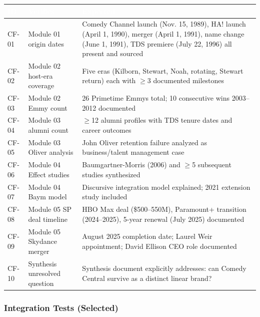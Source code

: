 \documentclass[11pt,letterpaper]{article}
\newcommand{\tableheader}[1]{\textbf{\sffamily\textcolor{white}{#1}}}
\begin{document}
\begin{center}
\begin{tabularx}{\textwidth}{C{1.5cm}L{5cm}X}
\toprule
{}
\tableheader{ID} & \tableheader{Verifies} & \tableheader{Expected} \\
\midrule
CF-01 & Module 01 origin dates & Comedy Channel launch (Nov. 15, 1989), HA! launch (April 1, 1990), merger (April 1, 1991), name change (June 1, 1991), TDS premiere (July 22, 1996) all present and sourced \\
CF-02 & Module 02 host-era coverage & Five eras (Kilborn, Stewart, Noah, rotating, Stewart return) each with $\geq$3 documented milestones \\
CF-03 & Module 02 Emmy count & 26 Primetime Emmys total; 10 consecutive wins 2003--2012 documented \\
CF-04 & Module 03 alumni count & $\geq$12 alumni profiles with TDS tenure dates and career outcomes \\
CF-05 & Module 03 Oliver analysis & John Oliver retention failure analyzed as business/talent management case \\
CF-06 & Module 04 Effect studies & Baumgartner-Morris (2006) and $\geq$5 subsequent studies synthesized \\
CF-07 & Module 04 Baym model & Discursive integration model explained; 2021 extension study included \\
CF-08 & Module 05 SP deal timeline & HBO Max deal (\$500--550M), Paramount+ transition (2024--2025), 5-year renewal (July 2025) documented \\
CF-09 & Module 05 Skydance merger & August 2025 completion date; Laurel Weir appointment; David Ellison CEO role documented \\
CF-10 & Synthesis unresolved question & Synthesis document explicitly addresses: can Comedy Central survive as a distinct linear brand? \\
\bottomrule
\end{tabularx}
\end{center}

\subsubsection{Integration Tests (Selected)}
\end{document}
